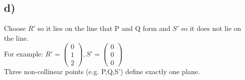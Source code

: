 \documentclass[a4paper,10pt]{article}
\begin{document}
\subsection*{d)}
Choose $R'$ so it lies on the line that P and Q form and $S'$ so it does not lie on the line. \\
For example: $ R' = \begin{pmatrix}0\\1\\2 \end{pmatrix}, S' = \begin{pmatrix}0\\0\\0 \end{pmatrix}$ \\
Three non-collinear points (e.g. P,Q,S') define exactly one plane.
\end{document}
